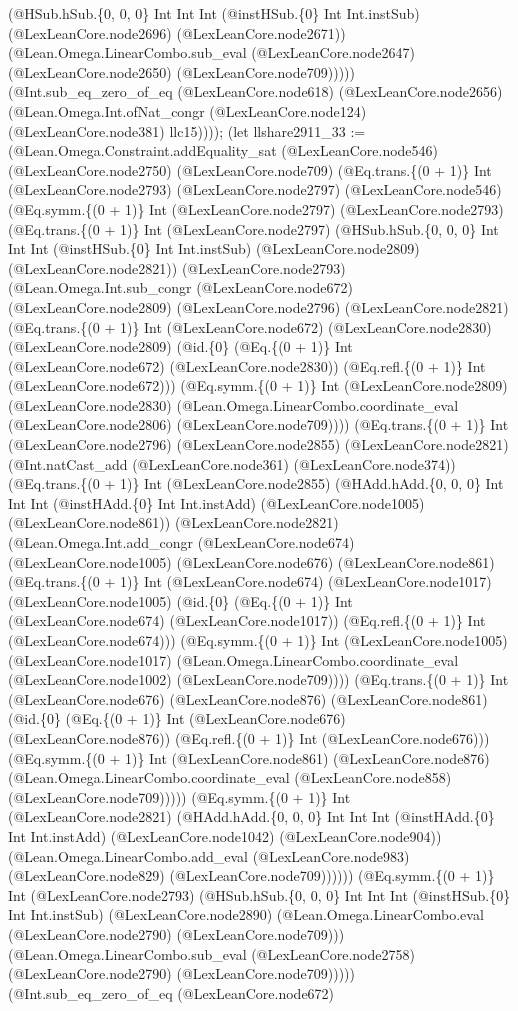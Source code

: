\documentclass[11pt]{article}
\begin{document}
(@HSub.hSub.\{0, 0, 0\} Int Int Int (@instHSub.\{0\} Int Int.instSub) (@LexLeanCore.node2696) (@LexLeanCore.node2671)) (@Lean.Omega.LinearCombo.sub\_eval (@LexLeanCore.node2647) (@LexLeanCore.node2650) (@LexLeanCore.node709))))) (@Int.sub\_eq\_zero\_of\_eq (@LexLeanCore.node618) (@LexLeanCore.node2656) (@Lean.Omega.Int.ofNat\_congr (@LexLeanCore.node124) (@LexLeanCore.node381) llc15)))); (let llshare2911\_33 := (@Lean.Omega.Constraint.addEquality\_sat (@LexLeanCore.node546) (@LexLeanCore.node2750) (@LexLeanCore.node709) (@Eq.trans.\{(0 + 1)\} Int (@LexLeanCore.node2793) (@LexLeanCore.node2797) (@LexLeanCore.node546) (@Eq.symm.\{(0 + 1)\} Int (@LexLeanCore.node2797) (@LexLeanCore.node2793) (@Eq.trans.\{(0 + 1)\} Int (@LexLeanCore.node2797) (@HSub.hSub.\{0, 0, 0\} Int Int Int (@instHSub.\{0\} Int Int.instSub) (@LexLeanCore.node2809) (@LexLeanCore.node2821)) (@LexLeanCore.node2793) (@Lean.Omega.Int.sub\_congr (@LexLeanCore.node672) (@LexLeanCore.node2809) (@LexLeanCore.node2796) (@LexLeanCore.node2821) (@Eq.trans.\{(0 + 1)\} Int (@LexLeanCore.node672) (@LexLeanCore.node2830) (@LexLeanCore.node2809) (@id.\{0\} (@Eq.\{(0 + 1)\} Int (@LexLeanCore.node672) (@LexLeanCore.node2830)) (@Eq.refl.\{(0 + 1)\} Int (@LexLeanCore.node672))) (@Eq.symm.\{(0 + 1)\} Int (@LexLeanCore.node2809) (@LexLeanCore.node2830) (@Lean.Omega.LinearCombo.coordinate\_eval (@LexLeanCore.node2806) (@LexLeanCore.node709)))) (@Eq.trans.\{(0 + 1)\} Int (@LexLeanCore.node2796) (@LexLeanCore.node2855) (@LexLeanCore.node2821) (@Int.natCast\_add (@LexLeanCore.node361) (@LexLeanCore.node374)) (@Eq.trans.\{(0 + 1)\} Int (@LexLeanCore.node2855) (@HAdd.hAdd.\{0, 0, 0\} Int Int Int (@instHAdd.\{0\} Int Int.instAdd) (@LexLeanCore.node1005) (@LexLeanCore.node861)) (@LexLeanCore.node2821) (@Lean.Omega.Int.add\_congr (@LexLeanCore.node674) (@LexLeanCore.node1005) (@LexLeanCore.node676) (@LexLeanCore.node861) (@Eq.trans.\{(0 + 1)\} Int (@LexLeanCore.node674) (@LexLeanCore.node1017) (@LexLeanCore.node1005) (@id.\{0\} (@Eq.\{(0 + 1)\} Int (@LexLeanCore.node674) (@LexLeanCore.node1017)) (@Eq.refl.\{(0 + 1)\} Int (@LexLeanCore.node674))) (@Eq.symm.\{(0 + 1)\} Int (@LexLeanCore.node1005) (@LexLeanCore.node1017) (@Lean.Omega.LinearCombo.coordinate\_eval (@LexLeanCore.node1002) (@LexLeanCore.node709)))) (@Eq.trans.\{(0 + 1)\} Int (@LexLeanCore.node676) (@LexLeanCore.node876) (@LexLeanCore.node861) (@id.\{0\} (@Eq.\{(0 + 1)\} Int (@LexLeanCore.node676) (@LexLeanCore.node876)) (@Eq.refl.\{(0 + 1)\} Int (@LexLeanCore.node676))) (@Eq.symm.\{(0 + 1)\} Int (@LexLeanCore.node861) (@LexLeanCore.node876) (@Lean.Omega.LinearCombo.coordinate\_eval (@LexLeanCore.node858) (@LexLeanCore.node709))))) (@Eq.symm.\{(0 + 1)\} Int (@LexLeanCore.node2821) (@HAdd.hAdd.\{0, 0, 0\} Int Int Int (@instHAdd.\{0\} Int Int.instAdd) (@LexLeanCore.node1042) (@LexLeanCore.node904)) (@Lean.Omega.LinearCombo.add\_eval (@LexLeanCore.node983) (@LexLeanCore.node829) (@LexLeanCore.node709)))))) (@Eq.symm.\{(0 + 1)\} Int (@LexLeanCore.node2793) (@HSub.hSub.\{0, 0, 0\} Int Int Int (@instHSub.\{0\} Int Int.instSub) (@LexLeanCore.node2890) (@Lean.Omega.LinearCombo.eval (@LexLeanCore.node2790) (@LexLeanCore.node709))) (@Lean.Omega.LinearCombo.sub\_eval (@LexLeanCore.node2758) (@LexLeanCore.node2790) (@LexLeanCore.node709))))) (@Int.sub\_eq\_zero\_of\_eq (@LexLeanCore.node672) 
\end{document}
